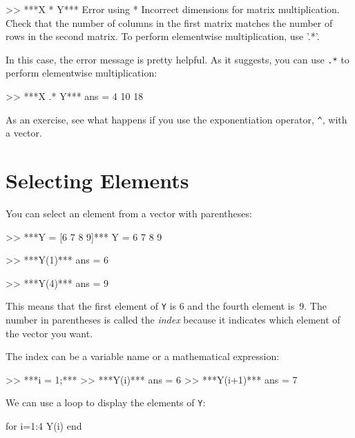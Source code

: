 \begin{code}
>> ***X * Y***
Error using  * 
Incorrect dimensions for matrix multiplication. 
Check that the number of columns in the first matrix 
matches the number of rows in the second matrix.
To perform elementwise multiplication, use '.*'.
\end{code}

In this case, the error message is pretty helpful.  As it suggests, you can use \lstinline{.*} to perform elementwise multiplication:


\begin{code}
>> ***X .* Y***
ans = 4    10    18
\end{code}

As an exercise, see what happens if you use the exponentiation operator,
\lstinline{^}, with a vector.

\section{Selecting Elements}


You can select an element from a vector with parentheses:

\begin{code}
>> ***Y = [6 7 8 9]***
Y = 6    7     8     9

>> ***Y(1)***
ans = 6

>> ***Y(4)***
ans = 9
\end{code}

This means that the first element of \lstinline{Y} is 6 and the
fourth element is~9.
The number in parentheses is called the \emph{index} because it indicates which element of the vector you want.


The index can be a variable name or a mathematical expression:

\begin{code}
>> ***i = 1;***
>> ***Y(i)***
ans = 6
>> ***Y(i+1)***
ans = 7
\end{code}

We can use a loop to display the elements of \lstinline{Y}:


\begin{code}
for i=1:4
     Y(i)
end
\end{code}

